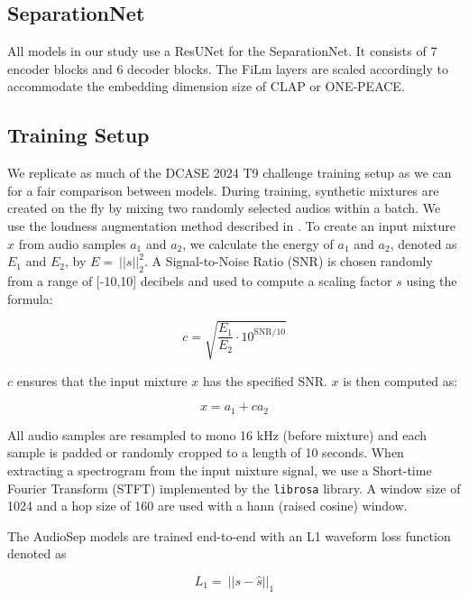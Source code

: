 \documentclass[11pt]{article}
\begin{document}
\subsection{SeparationNet}
All models in our study use a ResUNet for the SeparationNet. It consists of 7 encoder blocks and 6 decoder blocks. The FiLm layers are scaled accordingly to accommodate the embedding dimension size of CLAP or ONE-PEACE. 

\subsection{Training Setup}
We replicate as much of the DCASE 2024 T9 challenge training setup as we can for a fair comparison between models. During training, synthetic mixtures are created on the fly by mixing two randomly selected audios within a batch. We use the loudness augmentation method described in \cite{kong2023universal}. To create an input mixture $x$ from audio samples $a_1$ and $a_2$, we calculate the energy of $a_1$ and $a_2$, denoted as $E_1$ and $E_2$, by $E = \ \left\vert\vert s \vert\right\vert^2_2 $. A Signal-to-Noise Ratio (SNR) is chosen randomly from a range of [-10,10] decibels and used to compute a scaling factor $s$ using the formula:

\begin{equation}
  \label{eq:scale}
  c = \sqrt{\frac{E_1}{E_2} \cdot 10^{\text{SNR}/10}}
\end{equation}

\noindent $c$ ensures that the input mixture $x$ has the specified SNR. $x$ is then computed as:

\begin{equation}
    \label{mixture}
    x = a_1 + c a_2
\end{equation}


All audio samples are resampled to mono 16 kHz (before mixture) and each sample is padded or randomly cropped to a length of 10 seconds. When extracting a spectrogram from the input mixture signal, we use a Short-time Fourier Transform (STFT) implemented by the \verb|librosa| library. A window size of 1024 and a hop size of 160 are used with a hann (raised cosine) window.

The AudioSep models are trained end-to-end with an L1 waveform loss function denoted as

\begin{equation}
    L_1 = \ \left\vert\vert s - \hat{s} \vert\right\vert_1
\end{equation}
\end{document}
